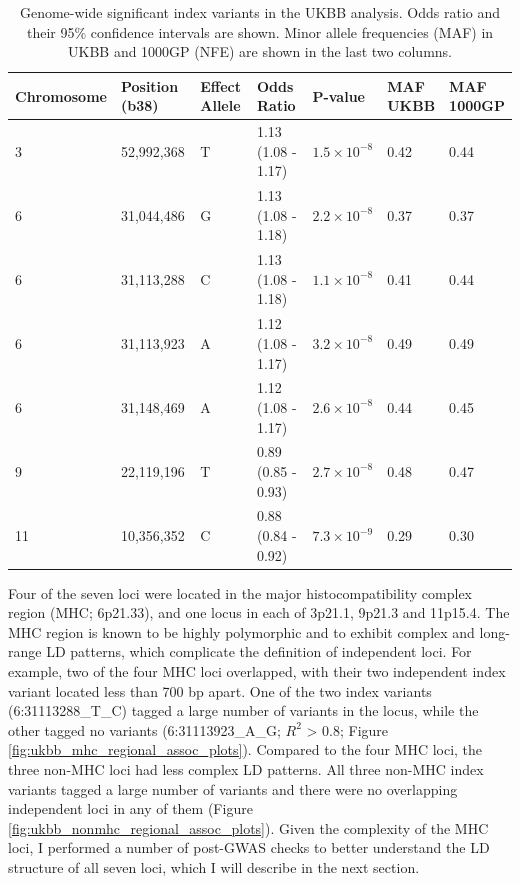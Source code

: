   \begin{table}[htb]
    \centering\begingroup\fontsize{10}{14}\selectfont
    \caption[pAD-associated variants from the UKBB GWAS]{Genome-wide significant index variants in the UKBB analysis. Odds ratio and their 95\% confidence intervals are shown. Minor allele frequencies (MAF) in UKBB and 1000GP (NFE) are shown in the last two columns.}
    \label{table:gws}
    \begin{tabular}[t]{|l|l|l|l|l|l|l|}
      \hline
      Chromosome & Position (b38) & Effect Allele & Odds Ratio & P-value & \makecell{MAF\\ UKBB} & \makecell{MAF\\ 1000GP}\\
      \hline
      3 & 52,992,368 & T & 1.13 (1.08 - 1.17) & $1.5\times10^{-8}$ & 0.42 & 0.44\\
      \hline
      6 & 31,044,486 & G & 1.13 (1.08 - 1.18) & $2.2\times10^{-8}$ & 0.37 & 0.37\\
      \hline
      6 & 31,113,288 & C & 1.13 (1.08 - 1.18) & $1.1\times10^{-8}$ & 0.41 & 0.44\\
      \hline
      6 & 31,113,923 & A & 1.12 (1.08 - 1.17) & $3.2\times10^{-8}$ & 0.49 & 0.49\\
      \hline
      6 & 31,148,469 & A & 1.12 (1.08 - 1.17) & $2.6\times10^{-8}$ & 0.44 & 0.45\\
      \hline
      9 & 22,119,196 & T & 0.89 (0.85 - 0.93) & $2.7\times10^{-8}$ & 0.48 & 0.47\\
      \hline
      11 & 10,356,352 & C & 0.88 (0.84 - 0.92) & $7.3\times10^{-9}$ & 0.29 & 0.30\\
      \hline
      \end{tabular}

    \endgroup{}

    \end{table}

    Four of the seven loci were located in the major histocompatibility complex region (MHC; 6p21.33), and one locus in each of 3p21.1, 9p21.3 and 11p15.4. The MHC region is known to be highly polymorphic and to exhibit complex and long-range LD patterns, which complicate the definition of independent loci. 
    For example, two of the four MHC loci overlapped, with their two independent index variant located less than 700 bp apart. One of the two index variants (6:31113288\_T\_C) tagged a large number of variants in the locus, while the other tagged no variants (6:31113923\_A\_G; $R^{2}$ > 0.8; Figure \ref{fig:ukbb_mhc_regional_assoc_plots}). Compared to the four MHC loci, the three non-MHC loci had less complex LD patterns. All three non-MHC index variants tagged a large number of variants and there were no overlapping independent loci in any of them (Figure \ref{fig:ukbb_nonmhc_regional_assoc_plots}). Given the complexity of the MHC loci, I performed a number of post-GWAS checks to better understand the LD structure of all seven loci, which I will describe in the next section.


